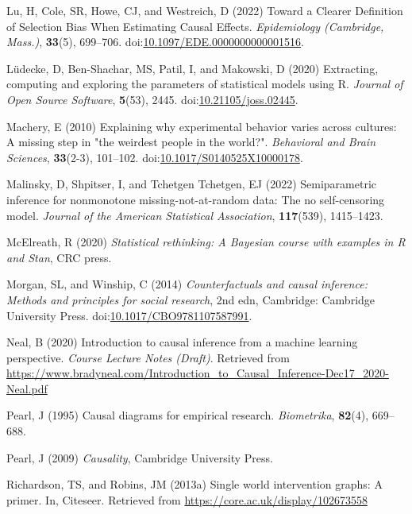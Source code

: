 \documentclass[
  single column]{article}
\newlength{\cslhangindent}
\newenvironment{CSLReferences}[2] %
 {\begin{list}{}{%
  \setlength{\itemindent}{0pt}
  \setlength{\leftmargin}{0pt}
  \setlength{\parsep}{0pt}
  \ifodd #1
   \setlength{\leftmargin}{\cslhangindent}
   \setlength{\itemindent}{-1\cslhangindent}
  \fi
  \setlength{\itemsep}{#2\baselineskip}}}
 {\end{list}}
\begin{document}
\begin{CSLReferences}{1}{0}
Lu, H, Cole, SR, Howe, CJ, and Westreich, D (2022) Toward a Clearer
Definition of Selection Bias When Estimating Causal Effects.
\emph{Epidemiology (Cambridge, Mass.)}, \textbf{33}(5), 699--706.
doi:\href{https://doi.org/10.1097/EDE.0000000000001516}{10.1097/EDE.0000000000001516}.

Lüdecke, D, Ben-Shachar, MS, Patil, I, and Makowski, D (2020)
Extracting, computing and exploring the parameters of statistical models
using {R}. \emph{Journal of Open Source Software}, \textbf{5}(53), 2445.
doi:\href{https://doi.org/10.21105/joss.02445}{10.21105/joss.02445}.

Machery, E (2010) Explaining why experimental behavior varies across
cultures: A missing step in "the weirdest people in the world?".
\emph{Behavioral and Brain Sciences}, \textbf{33}(2-3), 101--102.
doi:\href{https://doi.org/10.1017/S0140525X10000178}{10.1017/S0140525X10000178}.

Malinsky, D, Shpitser, I, and Tchetgen Tchetgen, EJ (2022)
Semiparametric inference for nonmonotone missing-not-at-random data: The
no self-censoring model. \emph{Journal of the American Statistical
Association}, \textbf{117}(539), 1415--1423.

McElreath, R (2020) \emph{Statistical rethinking: A {B}ayesian course
with examples in {R} and {S}tan}, CRC press.

Morgan, SL, and Winship, C (2014) \emph{Counterfactuals and causal
inference: Methods and principles for social research}, 2nd edn,
Cambridge: Cambridge University Press.
doi:\href{https://doi.org/10.1017/CBO9781107587991}{10.1017/CBO9781107587991}.

Neal, B (2020) Introduction to causal inference from a machine learning
perspective. \emph{Course Lecture Notes (Draft)}. Retrieved from
\url{https://www.bradyneal.com/Introduction_to_Causal_Inference-Dec17_2020-Neal.pdf}

Pearl, J (1995) Causal diagrams for empirical research.
\emph{Biometrika}, \textbf{82}(4), 669--688.

Pearl, J (2009) \emph{Causality}, Cambridge University Press.

Richardson, TS, and Robins, JM (2013a) Single world intervention graphs:
A primer. In, Citeseer. Retrieved from
\url{https://core.ac.uk/display/102673558}


\end{CSLReferences}
\end{document}
